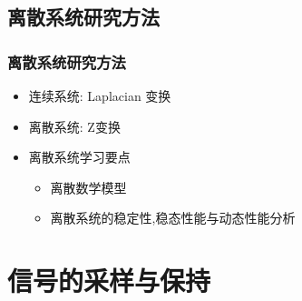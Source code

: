 \documentclass[table]{beamer}
\begin{document}
\subsection{离散系统研究方法}
\label{sec-1-4}
\begin{frame}
\frametitle{离散系统研究方法}
\label{sec-1-4-1}

\begin{itemize}
\item 连续系统: Laplacian 变换
\item <2->离散系统: Z变换
\item <3->离散系统学习要点
\begin{itemize}
\item <4->离散数学模型
\item <5->离散系统的稳定性,稳态性能与动态性能分析
\end{itemize}
\end{itemize}
\end{frame}
\section{信号的采样与保持}
\label{sec-2}
\end{document}
